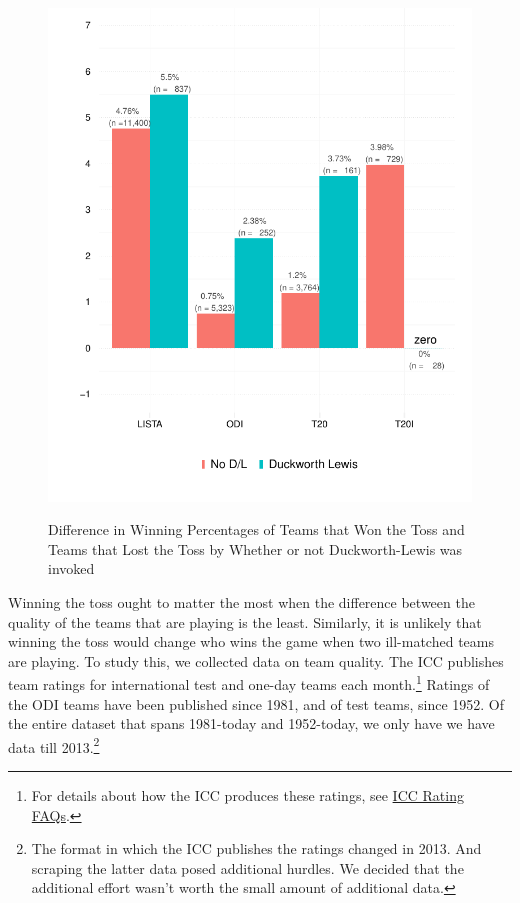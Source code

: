 \documentclass[12pt]{article}
\begin{document}
\begin{figure}[htbp]
\centering
\caption{Difference in Winning Percentages of Teams that Won the Toss and Teams that Lost the Toss by Whether or not Duckworth-Lewis was invoked}
\includegraphics[scale=.85]{../figs/winbyDL.pdf}
\label{fig:dl}
\end{figure}

Winning the toss ought to matter the most when the difference between the quality of the teams that are playing is the least. Similarly, it is unlikely that winning the toss would change who wins the game when two ill-matched teams are playing. To study this, we collected data on team quality. The ICC publishes team ratings for international test and one-day teams each month.\footnote{For details about how the ICC produces these ratings, see \href{http://icc-live.s3.amazonaws.com/cms/media/about_docs/536b1a48c16e5-Reliance\%20ICC\%20ODI\%20Team\%20Rankings\%20FAQs\%202014.pdf}{ICC Rating FAQs}.} Ratings of the ODI teams have been published since 1981, and of test teams, since 1952. Of the entire dataset that spans 1981-today and 1952-today, we only have we have data till 2013.\footnote{The format in which the ICC publishes the ratings changed in 2013. And scraping the latter data posed additional hurdles. We decided that the additional effort wasn't worth the small amount of additional data.} 
\end{document}
